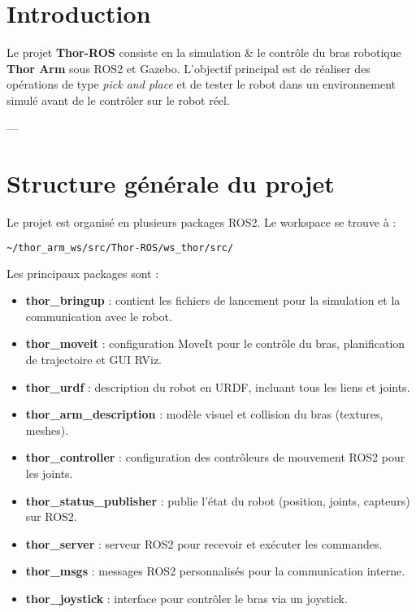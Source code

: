 \documentclass[a4paper,12pt]{article}
\numberwithin{equation}{section}
\begin{document}
\tableofcontents
\newpage

\section{Introduction}
Le projet \textbf{Thor-ROS} consiste en la simulation \& le contrôle du bras robotique \textbf{Thor Arm} sous ROS2 et Gazebo.  
L'objectif principal est de réaliser des opérations de type \textit{pick and place} et de tester le robot dans un environnement simulé avant de le contrôler sur le robot réel.  

---

\section{Structure générale du projet}

Le projet est organisé en plusieurs packages ROS2. Le workspace se trouve à :

\begin{lstlisting}[language=bash]
~/thor_arm_ws/src/Thor-ROS/ws_thor/src/
\end{lstlisting}

Les principaux packages sont :

\begin{itemize}
    \item \textbf{thor\_bringup} : contient les fichiers de lancement pour la simulation et la communication avec le robot.
    \item \textbf{thor\_moveit} : configuration MoveIt pour le contrôle du bras, planification de trajectoire et GUI RViz.
    \item \textbf{thor\_urdf} : description du robot en URDF, incluant tous les liens et joints.
    \item \textbf{thor\_arm\_description} : modèle visuel et collision du bras (textures, meshes).
    \item \textbf{thor\_controller} : configuration des contrôleurs de mouvement ROS2 pour les joints.
    \item \textbf{thor\_status\_publisher} : publie l'état du robot (position, joints, capteurs) sur ROS2.
    \item \textbf{thor\_server} : serveur ROS2 pour recevoir et exécuter les commandes.
    \item \textbf{thor\_msgs} : messages ROS2 personnalisés pour la communication interne.
    \item \textbf{thor\_joystick} : interface pour contrôler le bras via un joystick.
\end{itemize}
\end{document}
